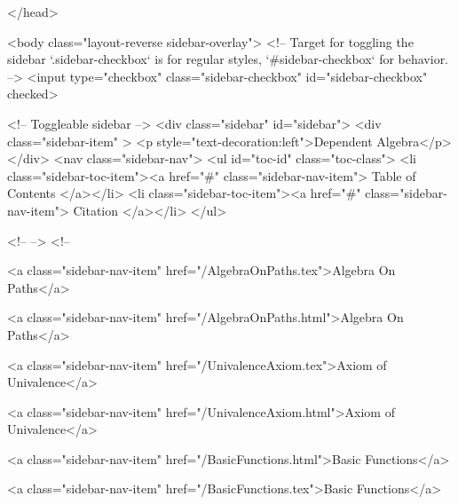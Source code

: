   
</head>




  <body class="layout-reverse sidebar-overlay">
    <!-- Target for toggling the sidebar `.sidebar-checkbox` is for regular
     styles, `#sidebar-checkbox` for behavior. -->
<input type="checkbox" class="sidebar-checkbox" id="sidebar-checkbox" checked>

<!-- Toggleable sidebar -->
<div class="sidebar" id="sidebar">
  <div class="sidebar-item" >
    <p style="text-decoration:left">Dependent Algebra</p>
  </div>
  <nav class="sidebar-nav">
    <ul id="toc-id" class="toc-class">
  <li class="sidebar-toc-item"><a href="#" class="sidebar-nav-item"> Table of Contents </a></li>
  <li class="sidebar-toc-item"><a href="#" class="sidebar-nav-item"> Citation </a></li>
</ul>


    <!--  -->
    <!-- 
      
    
      
    
      
    
      
        
      
    
      
        
          <a class="sidebar-nav-item" href="/AlgebraOnPaths.tex">Algebra On Paths</a>
        
      
    
      
        
          <a class="sidebar-nav-item" href="/AlgebraOnPaths.html">Algebra On Paths</a>
        
      
    
      
        
          <a class="sidebar-nav-item" href="/UnivalenceAxiom.tex">Axiom of Univalence</a>
        
      
    
      
        
          <a class="sidebar-nav-item" href="/UnivalenceAxiom.html">Axiom of Univalence</a>
        
      
    
      
        
          <a class="sidebar-nav-item" href="/BasicFunctions.html">Basic Functions</a>
        
      
    
      
        
          <a class="sidebar-nav-item" href="/BasicFunctions.tex">Basic Functions</a>
        
      
    
